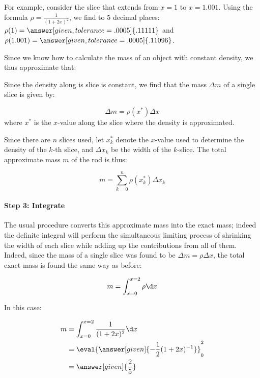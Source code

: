 \documentclass{ximera}
\begin{document}
For example, consider the slice that extends from $x=1$ to $x=1.001$.  Using the formula $\rho  = \frac{1}{(1+2x)^2}$, we find to 5 decimal places: $\rho(1) = \answer[given, tolerance=.0005]{.11111}$ and $\rho(1.001) = \answer[given,tolerance=.0005]{ .11096}$.  

Since we know how to calculate the mass of an object with constant density, we thus approximate that:

\begin{multipleChoice}
\end{multipleChoice}

Since the density along is slice is constant, we find that the mass $\Delta m$ of a single slice is given by: 

\[
\Delta m = \rho(x^*) \Delta x
\]
where $x^*$ is the $x$-value along the slice where the density is approximated.

Since there are $n$ slices used, let $x^*_k$ denote the $x$-value used to determine the density of the $k$-th slice, and $\Delta x_k$ be the width of the $k$-slice.  The total approximate mass $m$ of the rod is thus:

\[
m = \sum_{k=0}^n \rho(x_k^*) \Delta x_k
\]

\paragraph{Step 3: Integrate}  The usual procedure converts this approximate mass into the exact mass; indeed the definite integral will perform the simultaneous limiting process of shrinking the width of each slice while adding up the contributions from all of them.  Indeed, since the mass of a single slice was found to be $\Delta m = \rho \Delta x$, the total exact mass is found the same way as before:

\[
m = \int_{x=0}^{x=2} \rho \d x
\]

In this case:

\begin{align*}
m &= \int_{x=0}^{x=2} \frac{1}{(1+2x)^2} \d x \\
&= \eval{\answer[given]{-\frac{1}{2}(1+2x)^{-1}} }_0^2 \\
&= \answer[given]{\frac{2}{5}}
\end{align*}
\end{document}

